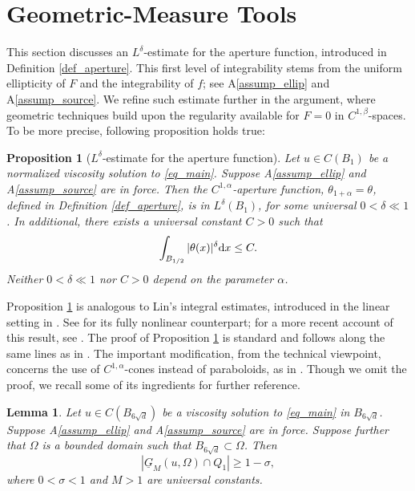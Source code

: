 \documentclass[10pt]{article} %
\newtheorem{Lemma}{Lemma}
\newtheorem{Proposition}{Proposition}
\begin{document}
\section{Geometric-Measure Tools}\label{sec_tools}

This section discusses an $L^\delta$-estimate for the aperture function, introduced in Definition \ref{def_aperture}. This first level of integrability stems from the uniform ellipticity of $F$ and the integrability of $f$; see A\ref{assump_ellip} and A\ref{assump_source}. We refine such estimate further in the argument, where geometric techniques build upon the regularity available for $F=0$ in $ C ^{1,\beta}$-spaces. To be more precise, following proposition holds true:

\begin{Proposition}[$L^\delta$-estimate for the aperture function]\label{prop_delta}
Let $u \in   C (B_1)$ be a normalized viscosity solution to \eqref{eq_main}. Suppose A\ref{assump_ellip} and A\ref{assump_source} are in force. Then the $C^{1,\alpha}$-aperture function, $\theta_{1+\alpha} = \theta$, defined in Definition \ref{def_aperture}, is in $L^\delta(B_1)$, for some universal $0<\delta\ll1$. In additional, there exists a universal constant $C>0$ such that
\[
	\int_{B_{1/2}}|\theta(x)|^\delta{\rm d}x  \leq  C.
\]
Neither $0<\delta\ll 1$ nor $C>0$ depend on the parameter $\alpha$.
\end{Proposition}

Proposition \ref{prop_delta} is analogous to Lin's integral estimates, introduced in the linear setting in \cite{Lin_1986}. See \cite{caf,cafcab} for its fully nonlinear counterpart; for a more recent account of this result, see \cite{ArmSilSma_2012, Mooney}. The proof of Proposition \ref{prop_delta} is standard and follows along the same lines as in \cite[Chapter 7]{cafcab}. The important modification, from the technical viewpoint, concerns the use of $C^{1,\alpha}$-cones instead of paraboloids, as in \cite{cafcab}. Though we omit the proof, we recall some of its ingredients for further reference.

\begin{Lemma}\label{lem_7.5}
Let $u \in   C (B_{6\sqrt{d}})$ be a viscosity solution to \eqref{eq_main} in $B_{6\sqrt{d}}$. Suppose A\ref{assump_ellip} and A\ref{assump_source} are in force. Suppose further that $\Omega$ is a bounded domain such that $B_{6\sqrt{d}} \subset \Omega$. Then
\[
	\left|\underline{G}_M(u,\Omega)\cap Q_1\right|  \geq  1 - \sigma,
\] 
where $0<\sigma<1$ and $M>1$ are universal constants.
\end{Lemma}
\end{document}
